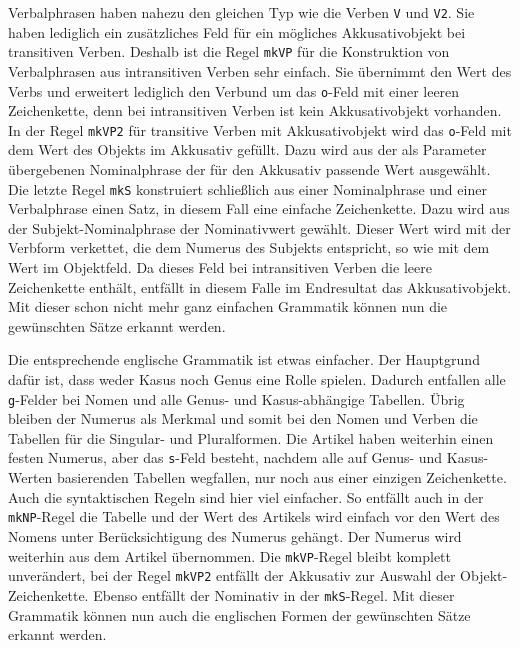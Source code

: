 Verbalphrasen haben nahezu den gleichen Typ wie die Verben \texttt{V} und \texttt{V2}. Sie haben lediglich ein zusätzliches Feld für ein mögliches Akkusativobjekt bei transitiven Verben. Deshalb ist die Regel \texttt{mkVP} für die Konstruktion von Verbalphrasen aus intransitiven Verben sehr einfach. Sie übernimmt den Wert des Verbs und erweitert lediglich den Verbund um das \texttt{o}-Feld mit einer leeren Zeichenkette, denn bei intransitiven Verben ist kein Akkusativobjekt vorhanden. In der Regel \texttt{mkVP2} für transitive Verben mit Akkusativobjekt wird das \texttt{o}-Feld mit dem Wert des Objekts im Akkusativ gefüllt. Dazu wird aus der als Parameter übergebenen Nominalphrase der für den Akkusativ passende Wert ausgewählt. Die letzte Regel \texttt{mkS} konstruiert schließlich aus einer Nominalphrase und einer Verbalphrase einen Satz, in diesem Fall eine einfache Zeichenkette. Dazu wird aus der Subjekt-Nominalphrase der Nominativwert gewählt. Dieser Wert wird mit der Verbform verkettet, die dem Numerus des Subjekts entspricht, so wie mit dem Wert im Objektfeld. Da dieses Feld bei intransitiven Verben die leere Zeichenkette enthält, entfällt in diesem Falle im Endresultat das Akkusativobjekt. Mit dieser schon nicht mehr ganz einfachen Grammatik können nun die gewünschten Sätze erkannt werden. \par

Die entsprechende englische Grammatik ist etwas einfacher. Der Hauptgrund dafür ist, dass weder Kasus noch Genus eine Rolle spielen. Dadurch entfallen alle \texttt{g}-Felder bei Nomen und alle Genus- und Kasus-abhängige Tabellen. Übrig bleiben der Numerus als Merkmal und somit bei den Nomen und Verben die Tabellen für die Singular- und Pluralformen. Die Artikel haben weiterhin einen festen Numerus, aber das \texttt{s}-Feld besteht, nachdem alle auf Genus- und Kasus-Werten basierenden Tabellen wegfallen, nur noch aus einer einzigen Zeichenkette. Auch die syntaktischen Regeln sind hier viel einfacher. So entfällt auch in der \texttt{mkNP}-Regel die Tabelle und der Wert des Artikels wird einfach vor den Wert des Nomens unter Berücksichtigung des Numerus gehängt. Der Numerus wird weiterhin aus dem Artikel übernommen. Die \texttt{mkVP}-Regel bleibt komplett unverändert, bei der Regel \texttt{mkVP2} entfällt der Akkusativ zur Auswahl der Objekt-Zeichenkette. Ebenso entfällt der Nominativ in der \texttt{mkS}-Regel. Mit dieser Grammatik können nun auch die englischen Formen der gewünschten Sätze erkannt werden. \par

